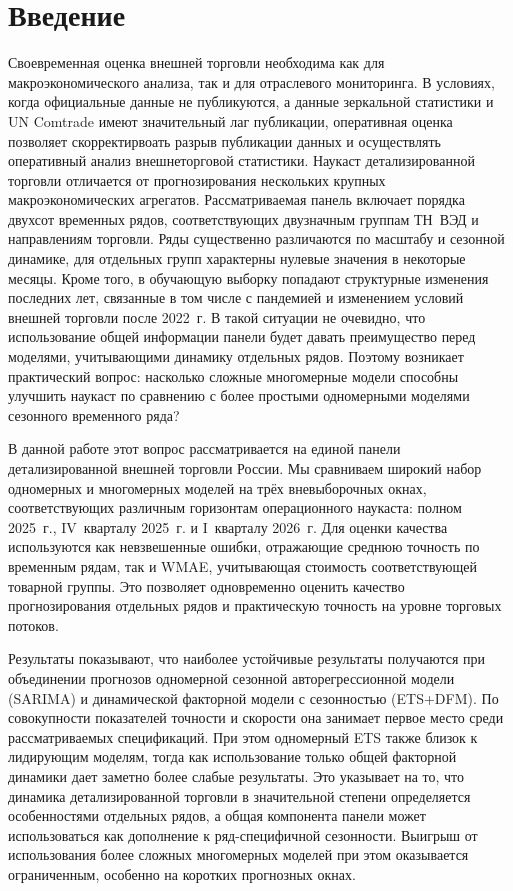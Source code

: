 \documentclass[12pt]{article}
\begin{document}
\newpage
\setlength{\parindent}{15pt}

\section{Введение}

Своевременная оценка внешней торговли необходима как для макроэкономического анализа, так и для отраслевого мониторинга. В условиях, когда официальные данные не публикуются, а данные зеркальной статистики и UN Comtrade имеют значительный лаг публикации, оперативная оценка позволяет скорректирвоать разрыв публикации данных и осуществлять оперативный анализ внешнеторговой статистики. Наукаст детализированной торговли отличается от прогнозирования нескольких крупных макроэкономических агрегатов. Рассматриваемая панель включает порядка двухсот временных рядов, соответствующих двузначным группам ТН~ВЭД и направлениям торговли. Ряды существенно различаются по масштабу и сезонной динамике, для отдельных групп характерны нулевые значения в некоторые месяцы. Кроме того, в обучающую выборку попадают структурные изменения последних лет, связанные в том числе с пандемией и изменением условий внешней торговли после 2022~г. В такой ситуации не очевидно, что использование общей информации панели будет давать преимущество перед моделями, учитывающими динамику отдельных рядов. Поэтому возникает практический вопрос: насколько сложные многомерные модели способны улучшить наукаст по сравнению с более простыми одномерными моделями сезонного временного ряда?

В данной работе этот вопрос рассматривается на единой панели детализированной внешней торговли России. Мы сравниваем широкий набор одномерных и многомерных моделей на трёх вневыборочных окнах, соответствующих различным горизонтам операционного наукаста: полном 2025~г., IV~кварталу 2025~г. и I~кварталу 2026~г. Для оценки качества используются как невзвешенные ошибки, отражающие среднюю точность по временным рядам, так и WMAE, учитывающая стоимость соответствующей товарной группы. Это позволяет одновременно оценить качество прогнозирования отдельных рядов и практическую точность на уровне торговых потоков.

Результаты показывают, что наиболее устойчивые результаты получаются при объединении прогнозов одномерной сезонной авторегрессионной модели (SARIMA) и динамической факторной модели с сезонностью (ETS+DFM). По совокупности показателей точности и скорости она занимает первое место среди рассматриваемых спецификаций. При этом одномерный ETS также близок к лидирующим моделям, тогда как использование только общей факторной динамики дает заметно более слабые результаты. Это указывает на то, что динамика детализированной торговли в значительной степени определяется особенностями отдельных рядов, а общая компонента панели может использоваться как дополнение к ряд-специфичной сезонности. Выигрыш от использования более сложных многомерных моделей при этом оказывается ограниченным, особенно на коротких прогнозных окнах.
\end{document}
